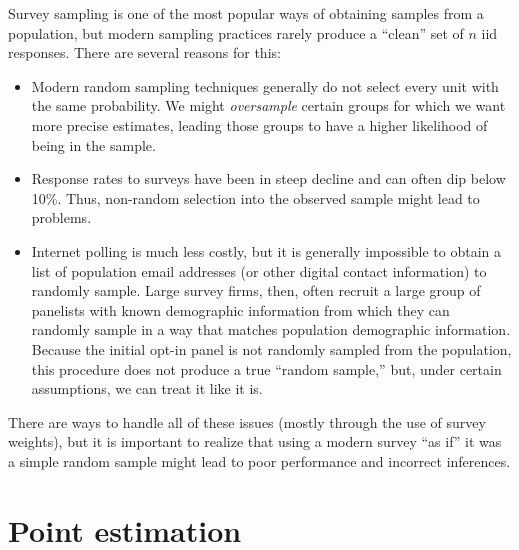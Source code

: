 \documentclass[
  letterpaper,
  DIV=11,
  numbers=noendperiod]{scrreprt}
\theoremstyle{definition}
\theoremstyle{plain}
\theoremstyle{definition}
\theoremstyle{remark}
\begin{document}
\begin{tcolorbox}[enhanced jigsaw, opacitybacktitle=0.6, bottomrule=.15mm, colback=white, colframe=quarto-callout-warning-color-frame, arc=.35mm, opacityback=0, breakable, leftrule=.75mm, titlerule=0mm, left=2mm, rightrule=.15mm, toptitle=1mm, bottomtitle=1mm, toprule=.15mm, title=\textcolor{quarto-callout-warning-color}{\faExclamationTriangle}\hspace{0.5em}{Warning}, colbacktitle=quarto-callout-warning-color!10!white, coltitle=black]

Survey sampling is one of the most popular ways of obtaining samples
from a population, but modern sampling practices rarely produce a
``clean'' set of \(n\) iid responses. There are several reasons for
this:

\begin{itemize}
\item
  Modern random sampling techniques generally do not select every unit
  with the same probability. We might \emph{oversample} certain groups
  for which we want more precise estimates, leading those groups to have
  a higher likelihood of being in the sample.
\item
  Response rates to surveys have been in steep decline and can often dip
  below 10\%. Thus, non-random selection into the observed sample might
  lead to problems.
\item
  Internet polling is much less costly, but it is generally impossible
  to obtain a list of population email addresses (or other digital
  contact information) to randomly sample. Large survey firms, then,
  often recruit a large group of panelists with known demographic
  information from which they can randomly sample in a way that matches
  population demographic information. Because the initial opt-in panel
  is not randomly sampled from the population, this procedure does not
  produce a true ``random sample,'' but, under certain assumptions, we
  can treat it like it is.
\end{itemize}

There are ways to handle all of these issues (mostly through the use of
survey weights), but it is important to realize that using a modern
survey ``as if'' it was a simple random sample might lead to poor
performance and incorrect inferences.

\end{tcolorbox}

\hypertarget{point-estimation}{%
\section{Point estimation}\label{point-estimation}}
\end{document}
